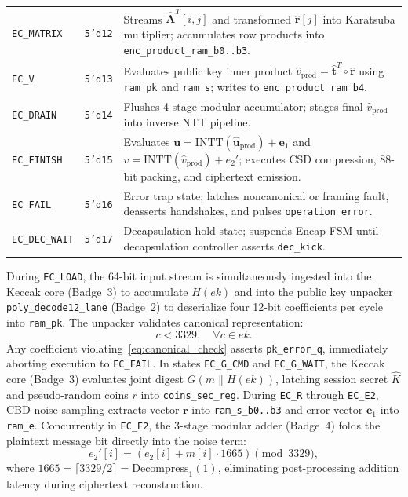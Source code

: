 \begin{table}[!t]
\begin{tabular}{@{} l c p{4.9cm} @{}}
\texttt{EC\_MATRIX} & \texttt{5'd12} & Streams $\hat{\mathbf{A}}^T[i, j]$ and transformed $\hat{\mathbf{r}}[j]$ into Karatsuba multiplier; accumulates row products into \texttt{enc\_product\_ram\_b0..b3}. \\
\texttt{EC\_V} & \texttt{5'd13} & Evaluates public key inner product $\hat{v}_{\text{prod}} = \hat{\mathbf{t}}^T \circ \hat{\mathbf{r}}$ using \texttt{ram\_pk} and \texttt{ram\_s}; writes to \texttt{enc\_product\_ram\_b4}. \\
\texttt{EC\_DRAIN} & \texttt{5'd14} & Flushes 4-stage modular accumulator; stages final $\hat{v}_{\text{prod}}$ into inverse NTT pipeline. \\
\texttt{EC\_FINISH} & \texttt{5'd15} & Evaluates $\mathbf{u} = \text{INTT}(\hat{\mathbf{u}}_{\text{prod}}) + \mathbf{e}_1$ and $v = \text{INTT}(\hat{v}_{\text{prod}}) + e_2'$; executes CSD compression, 88-bit packing, and ciphertext emission. \\
\texttt{EC\_FAIL} & \texttt{5'd16} & Error trap state; latches noncanonical or framing fault, deasserts handshakes, and pulses \texttt{operation\_error}. \\
\texttt{EC\_DEC\_WAIT} & \texttt{5'd17} & Decapsulation hold state; suspends Encap FSM until decapsulation controller asserts \texttt{dec\_kick}. \\
\bottomrule
\end{tabular}
\end{table}

During \texttt{EC\_LOAD}, the 64-bit input stream is simultaneously ingested into the Keccak core (Badge~3) to accumulate $H(ek)$ and into the public key unpacker \texttt{poly\_decode12\_lane} (Badge~2) to deserialize four 12-bit coefficients per cycle into \texttt{ram\_pk}. The unpacker validates canonical representation:
\begin{equation}
\label{eq:canonical_check}
c < 3329, \quad \forall c \in ek.
\end{equation}
Any coefficient violating~\eqref{eq:canonical_check} asserts \texttt{pk\_error\_q}, immediately aborting execution to \texttt{EC\_FAIL}. In states \texttt{EC\_G\_CMD} and \texttt{EC\_G\_WAIT}, the Keccak core (Badge~3) evaluates joint digest $G(m \parallel H(ek))$, latching session secret $\hat{K}$ and pseudo-random coins $r$ into \texttt{coins\_sec\_reg}. During \texttt{EC\_R} through \texttt{EC\_E2}, CBD noise sampling extracts vector $\mathbf{r}$ into \texttt{ram\_s\_b0..b3} and error vector $\mathbf{e}_1$ into \texttt{ram\_e}. Concurrently in \texttt{EC\_E2}, the 3-stage modular adder (Badge~4) folds the plaintext message bit directly into the noise term:
\begin{equation}
\label{eq:message_folding}
e_2'[i] = \left( e_2[i] + m[i] \cdot 1665 \right) \pmod{3329},
\end{equation}
where $1665 = \lceil 3329 / 2 \rceil = \text{Decompress}_1(1)$, eliminating post-processing addition latency during ciphertext reconstruction.

